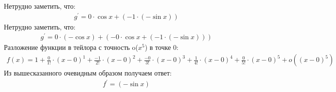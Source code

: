 \documentclass[12pt,a4paper]{scrartcl}
\begin{document}
Нетрудно заметить, что:
\begin{gather}\label{eq:f2a58490}g^\prime  = 0 \cdot  \cos{ x }  +  \left(-1 \cdot  \left(- \sin{ x } \right) \right) \end{gather}
Нетрудно заметить, что:
\begin{gather}\label{eq:f2a58460}g^\prime  = 0 \cdot  \left(- \cos{ x } \right)  +  \left(-0 \cdot  \cos{ x }  +  \left(-1 \cdot  \left(- \sin{ x } \right) \right) \right) \end{gather}
Разложение функции в тейлора с точность o($x^5$) в точке 0:
\begin{gather}\label{eq:3}f(x) = 1 + \frac{0}{1!} \cdot \left(x-0 \right)^1 + \frac{-1}{2!} \cdot \left(x-0 \right)^2 + \frac{-0}{3!} \cdot \left(x-0 \right)^3 + \frac{1}{4!} \cdot \left(x-0 \right)^4 + \frac{0}{5!} \cdot \left(x-0 \right)^5 + o((x-0)^5)\end{gather}
Из вышесказанного очевидным образом получаем ответ:
\begin{gather}\label{eq:f2a56ba0}f^\prime  =  \left(- \sin{ x } \right) \end{gather}
\end{document}
